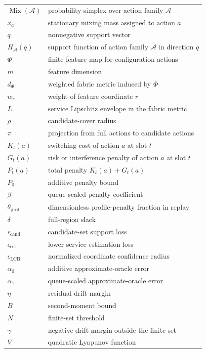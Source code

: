 \documentclass[opre,dblanonrev]{informs4}
\begin{document}
\begin{table}[t]
{\begin{tabular}{@{}p{}p{}@{}}
\(\operatorname{Mix}(\mathcal A)\) & probability simplex over action family \(\mathcal A\) \\
\(x_a\) & stationary mixing mass assigned to action \(a\) \\
\(q\) & nonnegative support vector \\
\(H_{\mathcal A}(q)\) & support function of action family \(\mathcal A\) in direction \(q\) \\
\(\Phi\) & finite feature map for configuration actions \\
\(m\) & feature dimension \\
\(d_{\Phi}\) & weighted fabric metric induced by \(\Phi\) \\
\(w_r\) & weight of feature coordinate \(r\) \\
\(L\) & service Lipschitz envelope in the fabric metric \\
\(\rho\) & candidate-cover radius \\
\(\pi\) & projection from full actions to candidate actions \\
\(K_t(a)\) & switching cost of action \(a\) at slot \(t\) \\
\(G_t(a)\) & risk or interference penalty of action \(a\) at slot \(t\) \\
\(P_t(a)\) & total penalty \(K_t(a)+G_t(a)\) \\
\(P_0\) & additive penalty bound \\
\(\beta\) & queue-scaled penalty coefficient \\
\(\theta_{\mathrm{prof}}\) & dimensionless profile-penalty fraction in replay \\
\(\delta\) & full-region slack \\
\(\epsilon_{\mathrm{cand}}\) & candidate-set support loss \\
\(\epsilon_{\mathrm{est}}\) & lower-service estimation loss \\
\(\epsilon_{\mathrm{LCB}}\) & normalized coordinate confidence radius \\
\(\alpha_0\) & additive approximate-oracle error \\
\(\alpha_1\) & queue-scaled approximate-oracle error \\
\(\eta\) & residual drift margin \\
\(B\) & second-moment bound \\
\(N\) & finite-set threshold \\
\(\gamma\) & negative-drift margin outside the finite set \\
\(V\) & quadratic Lyapunov function \\

\end{tabular}}
\end{table}
\end{document}

